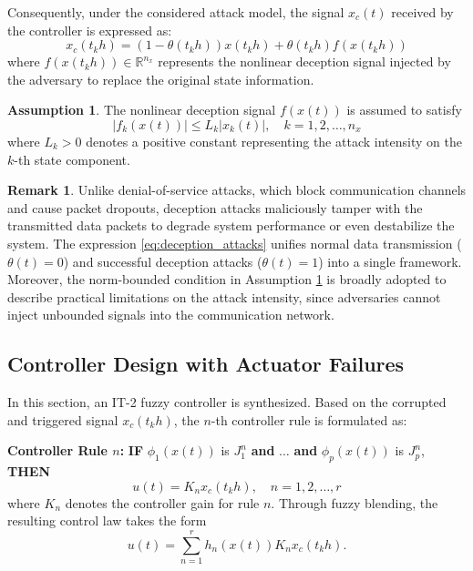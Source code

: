 \documentclass[preprint,review,fleqn,sort&compress,3p]{elsarticle}
\theoremstyle{definition} %
\theoremstyle{definition}%
\newtheorem{rem}{Remark}[section]
\newtheorem{asptn}{Assumption}[section]
\begin{document}
Consequently, under the considered attack model, the signal $x_c(t)$ received by the controller is expressed as:
\begin{equation}\label{eq:deception_attacks}
	x_c(t_{k} h) = (1 - \theta(t_{k} h)) x(t_{k} h) + \theta(t_{k} h) f(x(t_{k} h))
\end{equation}
where $f(x(t_{k}h)) \in \mathbb{R}^{n_x}$ represents the nonlinear deception signal injected by the adversary to replace the original state information.

\begin{asptn} \label{assump:attack_bound}
The nonlinear deception signal $f(x(t))$ is assumed to satisfy
\begin{equation}
	|f_k(x(t))| \le L_k |x_k(t)|,\quad k = 1,2,\ldots,n_x
\end{equation}
where $L_k > 0$ denotes a positive constant representing the attack intensity on the $k$-th state component.
\end{asptn}
\begin{rem}
	Unlike denial-of-service attacks, which block communication channels
	and cause packet dropouts, deception attacks maliciously tamper with the transmitted data packets to
	degrade system performance or even destabilize the system. The expression \eqref{eq:deception_attacks} unifies normal data transmission ($\theta(t) = 0$) and successful deception attacks ($\theta(t) = 1$) into
	a single framework. Moreover, the norm-bounded condition in Assumption \ref{assump:attack_bound} is broadly adopted to
	describe practical limitations on the attack intensity, since adversaries cannot inject unbounded signals
	into the communication network.
\end{rem}

\subsection{Controller Design with Actuator Failures}
In this section, an IT-2 fuzzy controller is synthesized. Based on the corrupted and triggered signal $x_c(t_k h)$, the $n$-th controller rule is formulated as:

\textbf{Controller Rule $n$:} 
\textbf{IF} $\phi_1(x(t))$ is $J^{n}_1$ \textbf{and} $\dots$ \textbf{and} $\phi_p(x(t))$ is $J^{n}_p$, \textbf{THEN}
\begin{equation} 
	u(t) = K_{n} x_c(t_{k} h), \quad n = 1, 2, \ldots, r
\end{equation}
where $K_n$ denotes the controller gain for rule $n$. Through fuzzy blending, the resulting control law takes the form
\begin{equation} 
	u(t) = \sum_{n=1}^{r} h_n(x(t)) K_{n} x_c(t_k h).
\end{equation}
\end{document}
